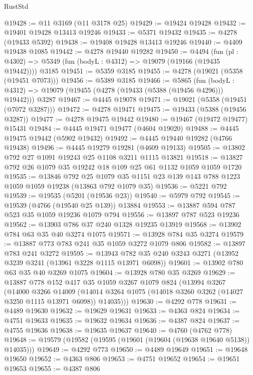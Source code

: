 \begin{lexlean}{RustStd}
\begin{coremodule}
{\begin{coremodule}
{{{{{{{{{{{{{{{{{{{{{{{{{{{{{{{{{{{@19428 := @11 @3169 (@11 @3178 @25)
@19429 := @19424 @19428
@19432 := @19401 @19428 @13413 @19246
@19433 := @5371 @19432
@19435 := @4278 (@19433 @5392)
@19438 := @19408 @19428 @13413 @19246
@19440 := @4409 @19438 @1085
@19442 := @4278 @19440 @19282
@19450 := @4494
    (fun (pl : @4302) => @5349 (fun (bodyL : @4312) => @19079 (@19166 (@19435 @19442))))
    @3185
@19451 := @5359 @3185
@19455 := @4278 (@19021 (@5358 (@19451 @7073)))
@19456 := @5389 @3185
@19466 := @5865
    (fun (bodyL : @4312) => @19079 (@19455 (@4278 (@19433 (@5388 (@19456 @4296))) @19442)))
    @3287
@19467 := @4445 @19078
@19471 := @19021 (@5358 (@19451 (@7072 @3287)))
@19472 := @4278 @19471
@19475 := @19433 (@5388 (@19456 @3287))
@19477 := @4278 @19475 @19442
@19480 := @19467 (@19472 @19477) @15431
@19484 := @4445 @19471 @19477 (@4604 @19020)
@19488 := @4445 @19475 @19442 (@5902 @19432)
@19492 := @4445 @19440 @19282 (@4766 @19438)
@19496 := @4445 @19279 @19281 (@4609 @19133)
@19505 := @13802 @792 @27 @1091 @19243 @25 @1108 @3211 @1115 @13821
@19518 := @13827 @792 @26 @1079 @35 @19242 @18 @109 @25 @61 @1132 @1059 @1059 @1720
@19535 := @13846
    @792
    @25
    @1079
    @35
    @1151
    @23
    @139
    @143
    @788
    @1223
    @1059
    @1059
    @19238
    (@13863 @792 @1079 @35)
@19536 := @5221 @792
@19539 := @19535 (@5201 (@19536 @23))
@19540 := @5979 @792
@19545 := @19539 (@4766 (@19540 @25 @139)) @13884
@19553 := @13887 @594 @787 @523 @35 @1059 @19236 @1079 @794
@19556 := @13897 @787 @523 @19236
@19562 := @13903 @786 @37 @240 @1328 @19235 @13919
@19568 := @13902 @784 @63 @35 @40 @3274 @1075
@19571 := @13928 @784 @35 @3274
@19579 := @13887 @773 @783 @241 @35 @1059 @3272 @1079 @806
@19582 := @13897 @783 @241 @3272
@19595 := @13943 @782 @35 @240 @3243 @3271 (@13952 @3239 @3241 (@13961 @3228 @1115 @13971 @6098))
@19601 := @13902 @780 @63 @35 @40 @3269 @1075
@19604 := @13928 @780 @35 @3269
@19629 := @13887
    @778
    @152
    @417
    @35
    @1059
    @3267
    @1079
    @824
    (@13994
      @3267
      (@14000
        @3266
        @14009
        (@14014 @3264 @1075 (@14018 @3260 @3262 (@14027 @3250 @1115 @13971 @6098)) @14035)))
@19630 := @4292 @778
@19631 := @4489 @19630
@19632 := @19629 @19631
@19633 := @4363 @824
@19634 := @4751 @19633
@19635 := @19632 @19634
@19636 := @4387 @824
@19637 := @4755 @19636
@19638 := @19635 @19637
@19640 := @4760 (@4762 @778)
@19648 := @19579 (@19582 (@19595 (@19601 (@19604 (@19638 @19640 @5138)) @14035)))
@19649 := @4292 @773
@19650 := @4489 @19649
@19651 := @19648 @19650
@19652 := @4363 @806
@19653 := @4751 @19652
@19654 := @19651 @19653
@19655 := @4387 @806
}}}}}}}}}}}}}}}}}}}}}}}}}}}}}}}}}}}
\end{coremodule}}
\end{coremodule}
\end{lexlean}

